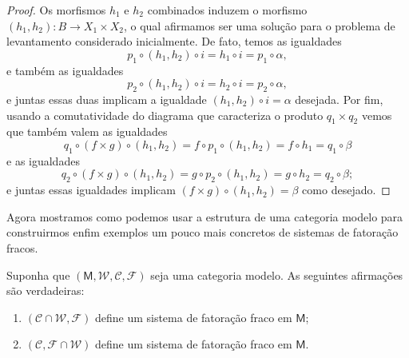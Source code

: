 \begin{proof}
  Os morfismos $h_{1}$ e $h_{2}$ combinados induzem o morfismo $(h_{1},h_{2}): B \to X_{1} \times X_{2}$, o qual afirmamos ser uma solução para o problema de levantamento considerado inicialmente.
  De fato, temos as igualdades
  \begin{displaymath}
    p_{1} \circ (h_{1},h_{2}) \circ i = h_{1} \circ i = p_{1} \circ \alpha,
  \end{displaymath}
  e também as igualdades
  \begin{displaymath}
    p_{2} \circ (h_{1},h_{2}) \circ i = h_{2} \circ i = p_{2} \circ \alpha,
  \end{displaymath}
  e juntas essas duas implicam a igualdade $(h_{1},h_{2}) \circ i = \alpha$ desejada.
  Por fim, usando a comutatividade do diagrama que caracteriza o produto $q_{1} \times q_{2}$ vemos que também valem as igualdades
  \begin{displaymath}
    q_{1} \circ (f \times g) \circ (h_{1},h_{2}) = f \circ p_{1} \circ (h_{1},h_{2}) = f \circ h_{1} = q_{1} \circ \beta
  \end{displaymath}
  e as igualdades
  \begin{displaymath}
    q_{2} \circ (f \times g) \circ (h_{1},h_{2}) = g \circ p_{2} \circ (h_{1},h_{2}) = g \circ h_{2} = q_{2} \circ \beta;
  \end{displaymath}
  e juntas essas igualdades implicam $(f \times g) \circ (h_{1},h_{2}) = \beta$ como desejado.
\end{proof}

Agora mostramos como podemos usar a estrutura de uma categoria modelo para construirmos enfim exemplos um pouco mais concretos de sistemas de fatoração fracos.

\begin{prop}
  Suponha que $(\mathsf{M},\mathcal{W},\mathcal{C},\mathcal{F})$ seja uma categoria modelo.
  As seguintes afirmações são verdadeiras:
  \begin{enumerate}
  \item $(\mathcal{C} \cap \mathcal{W},\mathcal{F})$ define um sistema de fatoração fraco em $\mathsf{M}$;
    
  \item $(\mathcal{C},\mathcal{F} \cap \mathcal{W})$ define um sistema de fatoração fraco em $\mathsf{M}$.
  \end{enumerate}
\end{prop}

